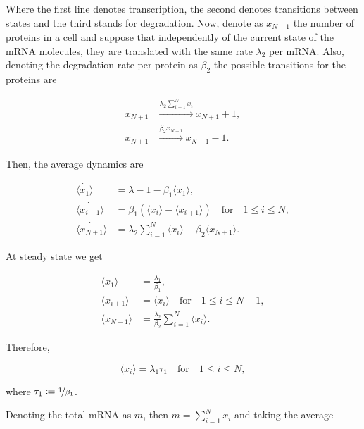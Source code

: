 Where the first line denotes transcription, the second denotes transitions between states and the third stands for degradation. Now, denote as $x_{N+1}$ the number of proteins in a cell and suppose that independently of the current state of the mRNA molecules, they are translated with the same rate $\lambda_2$ per mRNA. Also, denoting the degradation rate per protein as $\beta_2$ the possible transitions for the proteins are

\begin{equation}
  \begin{split}
    x_{N+1} &\xrightarrow{\lambda_2\sum_{i=1}^Nx_i} x_{N+1}+1,\\
    x_{N+1} &\xrightarrow{\beta_2x_{N+1}}x_{N+1}-1.
  \end{split}
\end{equation}

Then, the average dynamics are

\begin{equation}
  \begin{split}
    \dot{\langle x_1\rangle} &= \lambda-1 -\beta_1\langle x_1\rangle,\\
    \dot{\langle x_{i+1}\rangle} &= \beta_1\left(\langle x_i\rangle - \langle x_{i+1}\rangle\right)\quad\text{for}\quad 1\leq i\leq N,\\
    \dot{\langle x_{N+1}\rangle} &= \lambda_2\sum_{i=1}^N\langle x_i\rangle-\beta_2\langle x_{N+1}\rangle.
  \end{split}
\end{equation}

At steady state we get

\begin{equation}
  \begin{split}
    \langle x_1\rangle &= \frac{\lambda_1}{\beta_1},\\
    \langle x_{i+1}\rangle &= \langle x_i\rangle\quad\text{for}\quad 1\leq i\leq N-1,\\
    \langle x_{N+1}\rangle &= \frac{\lambda_2}{\beta_2}\sum_{i=1}^N\langle x_i\rangle.
  \end{split}
\end{equation}

Therefore,

\begin{equation}
  \langle x_i\rangle = \lambda_1\tau_1\quad\text{for}\quad 1\leq i\leq N,
\end{equation}

where $\tau_1 \coloneqq \nicefrac{1}{\beta_1}$.

Denoting the total mRNA as $m$, then $m=\sum_{i=1}^Nx_i$ and taking the average

